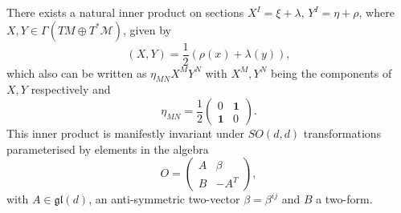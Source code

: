 There exists a natural inner product on sections $X^I=\xi+\lambda$, $Y^I=\eta+\rho$, where $X,Y\in\Gamma(TM\oplus T^*\mathcal{M})$, given by
\begin{equation}
    (X,Y) = \frac{1}{2}\left(\rho(x)+\lambda(y)\right),
\end{equation}
which also can be written as $\eta_{MN}X^MY^N$ with $X^M,Y^N$ being the components of $X,Y$ respectively and 
\begin{equation}
    \eta_{MN} = \frac{1}{2}\begin{pmatrix}0&\mathbf{1}\\\mathbf{1}&0\end{pmatrix}.
\end{equation}
This inner product is manifestly invariant under $SO(d,d)$ transformations parameterised by elements in the algebra 
\begin{equation}
    O = \begin{pmatrix}
            A & \beta \\
            B & -A^{T}
        \end{pmatrix},
\end{equation}
with $A\in \mathfrak{gl}(d)$, an anti-symmetric two-vector $\beta=\beta^{ij}$ and $B$ a two-form. 

